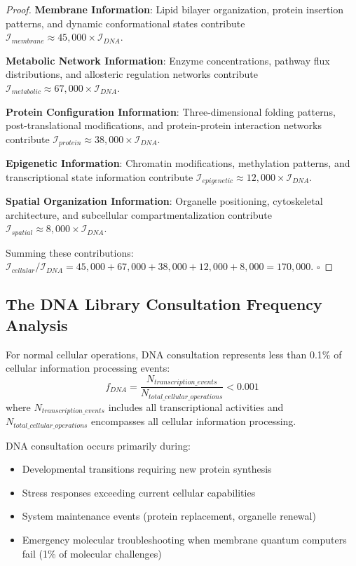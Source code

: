 ﻿\documentclass[11pt,a4paper]{article}
\begin{document}
\begin{proof}
\textbf{Membrane Information}: Lipid bilayer organization, protein insertion patterns, and dynamic conformational states contribute $\mathcal{I}_{membrane} \approx 45,000 \times \mathcal{I}_{DNA}$.

\textbf{Metabolic Network Information}: Enzyme concentrations, pathway flux distributions, and allosteric regulation networks contribute $\mathcal{I}_{metabolic} \approx 67,000 \times \mathcal{I}_{DNA}$.

\textbf{Protein Configuration Information}: Three-dimensional folding patterns, post-translational modifications, and protein-protein interaction networks contribute $\mathcal{I}_{protein} \approx 38,000 \times \mathcal{I}_{DNA}$.

\textbf{Epigenetic Information}: Chromatin modifications, methylation patterns, and transcriptional state information contribute $\mathcal{I}_{epigenetic} \approx 12,000 \times \mathcal{I}_{DNA}$.

\textbf{Spatial Organization Information}: Organelle positioning, cytoskeletal architecture, and subcellular compartmentalization contribute $\mathcal{I}_{spatial} \approx 8,000 \times \mathcal{I}_{DNA}$.

Summing these contributions: $\mathcal{I}_{cellular}/\mathcal{I}_{DNA} = 45,000 + 67,000 + 38,000 + 12,000 + 8,000 = 170,000$. $\square$
\end{proof}

\subsection{The DNA Library Consultation Frequency Analysis}

\begin{definition}
For normal cellular operations, DNA consultation represents less than 0.1\% of cellular information processing events:
\begin{equation}
f_{DNA} = \frac{N_{transcription\_events}}{N_{total\_cellular\_operations}} < 0.001
\end{equation}
where $N_{transcription\_events}$ includes all transcriptional activities and $N_{total\_cellular\_operations}$ encompasses all cellular information processing.
\end{definition}

DNA consultation occurs primarily during:
\begin{itemize}
\item Developmental transitions requiring new protein synthesis
\item Stress responses exceeding current cellular capabilities
\item System maintenance events (protein replacement, organelle renewal)
\item Emergency molecular troubleshooting when membrane quantum computers fail (1\% of molecular challenges)
\end{itemize}
\end{document}

